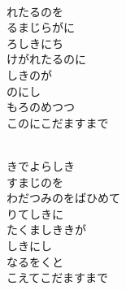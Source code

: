 \documentclass[10pt,b5j]{tarticle} %
\begin{document}
\vspace{1.5em} %
\newcommand{\linespace}{0.5em} %
\newcommand{\blocksize}{0.5\hsize} %
\newcommand{\itemmargin}{3em} %
\begin{enumerate} %
    \setlength{\itemindent}{\itemmargin} %
    \begin{minipage}[c]{\blocksize}
    
        \vspace{\linespace}
        \item~\\
        れたるのを\\
        るまじらがに\\
        ろしきにち\\
        けがれたるのに\\
        しきのが\\
        のにし\\
        もろのめつつ\\
        このにこだますまで
        
    \end{minipage}
    \begin{minipage}[c]{\blocksize}
        
        \vspace{\linespace}
        \item~\\
        きでよらしき\\
        すまじのを\\
        わだつみのをばひめて\\
        りてしきに\\
        たくましききが\\
        しきにし\\
        なるをくと\\
        こえてこだますまで
    
    \end{minipage}
\end{enumerate} %
\end{document}
